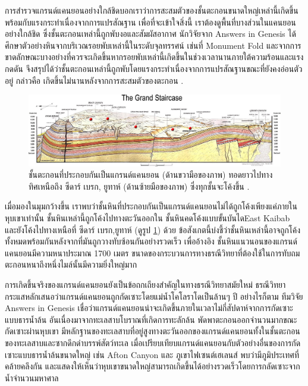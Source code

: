 \documentclass[10pt,twocolumn,letterpaper]{article}
\begin{document}
การสำรวจแกรนด์แคนยอนอย่างใกล้ชิดบอกเราว่าการสะสมตัวของชั้นตะกอนขนาดใหญ่เหล่านี้เกิดขึ้นพร้อมกับแรงกระทำเนื่องจากการแปรสัณฐาน เพื่อที่จะเข้าใจสิ่งนี้ เราต้องดูพื้นที่บางส่วนในแคนยอนอย่างใกล้ชิด ซึ่งชั้นตะกอนเหล่านี้ถูกพับงอและสัมผัสอากาศ  นักวิจัยจาก Answers in Genesis \cite{42} ได้ศึกษาตัวอย่างหินจากบริเวณรอยพับเหล่านี้ในระดับจุลทรรศน์ เช่นที่ Monument Fold และจากการขาดลักษณะบางอย่างที่ควรจะเกิดขึ้นหากรอยพับเหล่านี้เกิดขึ้นในช่วงเวลานานภายใต้ความร้อนและแรงกดดัน จึงสรุปได้ว่าชั้นตะกอนเหล่านี้ถูกพับโดยแรงกระทำเนื่องจากการแปรสัณฐานขณะที่ยังคงอ่อนตัวอยู่ กล่าวคือ เกิดขึ้นไม่นานหลังจากการสะสมตัวของตะกอน \cite{43}.

\begin{figure}
\begin{center}
\includegraphics[width=1\textwidth]{Grand_Staircase-big.jpg}
\end{center}
   \caption{ชั้นตะกอนที่ประกอบกันเป็นแกรนด์แคนยอน (ด้านขวามือของภาพ) ทอดยาวไปทางทิศเหนือถึง  ซีดาร์ เบรก, ยูทาห์ (ด้านซ้ายมือของภาพ) ซึ่งทุกชั้นจะโค้งขึ้น \cite{50}.}
\label{fig:4}
\end{figure}

เมื่อมองในมุมกว้างขึ้น เราพบว่าชั้นหินที่ประกอบกันเป็นแกรนด์แคนยอนไม่ได้ถูกโค้งเพียงแค่ภายในหุบเขาเท่านั้น ชั้นหินเหล่านี้ถูกโค้งไปทางตะวันออกใน ชั้นหินคดโค้งแบบขั้นบันไดEast Kaibab \cite{46} และยังโค้งไปทางเหนือที่ ซีดาร์ เบรก,ยูทาห์ (ดูรูป \ref{fig:4}) ด้วย ข้อสังเกตนี้บ่งชี้ว่าชั้นหินเหล่านี้อาจถูกโค้งทั้งหมดพร้อมกันหลังจากที่มันถูกวางทับซ้อนกันอย่างรวดเร็ว เพื่ออ้างอิง ชั้นหินแนวนอนของแกรนด์แคนยอนมีความหนาประมาณ 1700 เมตร ขนาดของกระบวนการทางธรณีวิทยาที่ต้องใช้ในการทับถมตะกอนหนาถึงหนึ่งไมล์นั้นมีความยิ่งใหญ่มาก

การเกิดขึ้นจริงของแกรนด์แคนยอนยังเป็นข้อถกเถียงสำคัญในทางธรณีวิทยาสมัยใหม่ ธรณีวิทยากระแสหลักเสนอว่าแกรนด์แคนยอนถูกกัดเซาะโดยแม่น้ำโคโลราโดเป็นล้านๆ ปี \cite{47} อย่างไรก็ตาม ทีมวิจัย Answers in Genesis เชื่อว่าแกรนด์แคนยอนน่าจะเกิดขึ้นภายในเวลาไม่กี่สัปดาห์จากการกัดเซาะแบบธารน้ำล้น อันเนื่องมาจากทะเลสาบโบราณที่เกิดการทะลักล้น พัดพาตะกอนออกจำนวนมากขณะกัดเซาะผ่านหุบเขา มีหลักฐานของทะเลสาบที่อยู่สูงทางตะวันออกของแกรนด์แคนยอนทั้งในชั้นตะกอนของทะเลสาบและซากดึกดำบรรพ์สัตว์ทะเล เมื่อเปรียบเทียบแกรนด์แคนยอนกับตัวอย่างอื่นของการกัดเซาะแบบธารน้ำล้นขนาดใหญ่ เช่น Afton Canyon และ  ภูเขาไฟเซนต์เฮเลนส์ พบว่ามีภูมิประเทศที่คล้ายคลึงกัน และแสดงให้เห็นว่าหุบเขาขนาดใหญ่สามารถเกิดขึ้นได้อย่างรวดเร็วโดยการกลัดเซาะจากน้ำจำนวนมหาศาล \cite{48}
\end{document}
